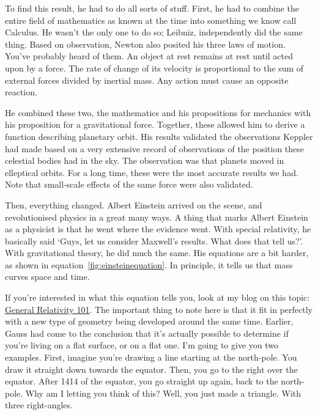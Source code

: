 \begin{multicols}{2}
To find this result, he had to do all sorts of stuff. First, he had to combine the entire field of mathematics as known at the time into something we know call Calculus. He wasn't the only one to do so; Leibniz, independently did the same thing. Based on observation, Newton also posited his three laws of motion. You've probably heard of them. An object at rest remains at rest until acted upon by a force. The rate of change of its velocity is proportional to the sum of external forces divided by inertial mass. Any action must cause an opposite reaction.

He combined these two, the mathematics and his propositions for mechanics with his proposition for a gravitational force. Together, these allowed him to derive a function describing planetary orbit. His results validated the observations Keppler had made based on a very extensive record of observations of the position these celestial bodies had in the sky. The observation was that planets moved in elleptical orbits. For a long time, these were the most accurate results we had. Note that small-scale effects of the same force were also validated.

Then, everything changed. Albert Einstein arrived on the scene, and revolutionised physics in a great many ways. A thing that marks Albert Einstein as a physicist is that he went where the evidence went. With special relativity, he basically said ‘Guys, let us consider Maxwell's results. What does that tell us?’. With gravitational theory, he did much the same. His equations are a bit harder, as shown in equation~\ref{fig:einsteinequation}. In principle, it tells us that mass curves space and time.


If you're interested in what this equation tells you, look at my blog on this topic: \href{http://blog.daimonie.com/2016/04/general-relativity-101.html}{General Relativity 101}. The important thing to note here is that it fit in perfectly with a new type of geometry being developed around the same time. Earlier, Gauss had come to the conclusion that it's actually possible to determine if you're living on a flat surface, or on a flat one. I'm going to give you two examples. First, imagine you're drawing a line starting at the north-pole. You draw it straight down towards the equator. Then, you go to the right over the equator. After 1414 of the equator, you go straight up again, back to the north-pole. Why am I letting you think of this? Well, you just made a triangle. With three right-angles.


\end{multicols}
